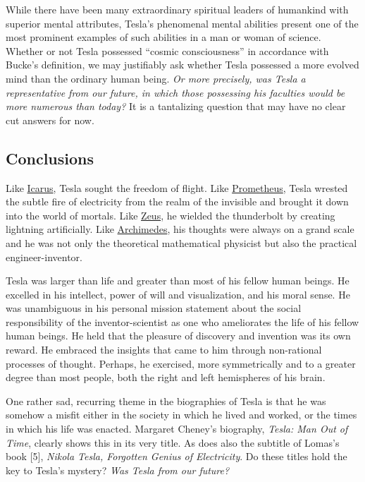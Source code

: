 \documentclass[
  11pt,
  a4paper,
]{article}
\begin{document}
While there have been many extraordinary spiritual leaders of humankind
with superior mental attributes, Tesla's phenomenal mental abilities
present one of the most prominent examples of such abilities in a man or
woman of science. Whether or not Tesla possessed ``cosmic
consciousness'' in accordance with Bucke's definition, we may
justifiably ask whether Tesla possessed a more evolved mind than the
ordinary human being. \emph{Or more precisely, was Tesla a
representative from our future, in which those possessing his faculties
would be more numerous than today?} It is a tantalizing question that
may have no clear cut answers for now.

\hypertarget{conclusions}{%
\subsection{Conclusions}\label{conclusions}}

Like \href{https://en.wikipedia.org/wiki/Icarus}{Icarus}, Tesla sought
the freedom of flight. Like
\href{https://en.wikipedia.org/wiki/Prometheus}{Prometheus}, Tesla
wrested the subtle fire of electricity from the realm of the invisible
and brought it down into the world of mortals. Like
\href{https://en.wikipedia.org/wiki/Zeus}{Zeus}, he wielded the
thunderbolt by creating lightning artificially. Like
\href{https://en.wikipedia.org/wiki/Archimedes}{Archimedes}, his
thoughts were always on a grand scale and he was not only the
theoretical mathematical physicist but also the practical
engineer-inventor.

Tesla was larger than life and greater than most of his fellow human
beings. He excelled in his intellect, power of will and visualization,
and his moral sense. He was unambiguous in his personal mission
statement about the social responsibility of the inventor-scientist as
one who ameliorates the life of his fellow human beings. He held that
the pleasure of discovery and invention was its own reward. He embraced
the insights that came to him through non-rational processes of thought.
Perhaps, he exercised, more symmetrically and to a greater degree than
most people, both the right and left hemispheres of his brain.

One rather sad, recurring theme in the biographies of Tesla is that he
was somehow a misfit either in the society in which he lived and worked,
or the times in which his life was enacted. Margaret Cheney's biography,
\emph{Tesla: Man Out of Time}, clearly shows this in its very title. As
does also the subtitle of Lomas's book {[}5{]}, \emph{Nikola Tesla,
Forgotten Genius of Electricity}. Do these titles hold the key to
Tesla's mystery? \emph{Was Tesla from our future?}
\end{document}
